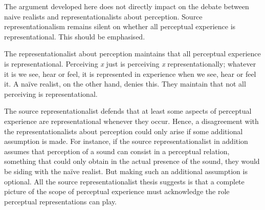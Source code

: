 \documentclass[sloppy, journal, git, anonymise, dodraft]{humapap}
\begin{document}
\sect The argument developed here does not directly impact on the debate
between naive realists and representationalists about perception. Source
representationalism remains silent on whether all perceptual experience
is representational. This should be emphasised.

The representationalist about perception maintains that all perceptual
experience is representational. Perceiving \emph{x} just is perceiving
\emph{x} representationally; whatever it is we see, hear or feel, it is
represented in experience when we see, hear or feel it. A naïve realist,
on the other hand, denies this. They maintain that not all perceiving is
representational.

The source representationalist defends that at least some aspects of
perceptual experience are representational whenever they occur. Hence, a disagreement with
the representationalists about perception could only arise if some
additional assumption is made. For instance, if the source
representationalist in addition assumes that perception of a sound can
consist in a perceptual relation, something that could only obtain in
the actual presence of the sound, they would be siding with the naïve
realist. But making such an additional assumption is optional. All the source representationalist thesis suggests is that a complete picture of the
scope of perceptual experience must acknowledge the role perceptual representations can play.

\printbibliography
\end{document}
